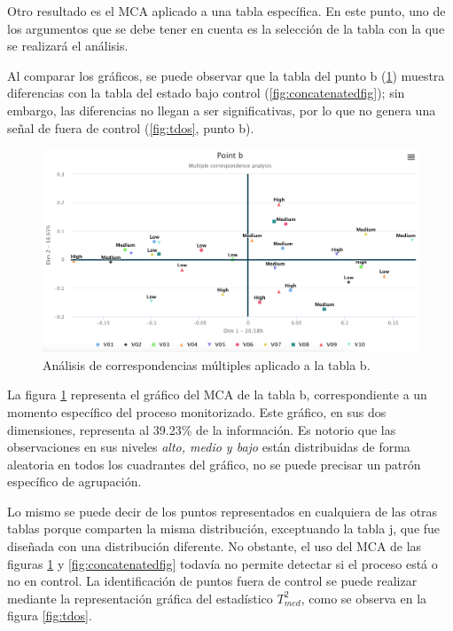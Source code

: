 \documentclass[mathematics,article,submit,moreauthors,pdftex]{mdpi}
\begin{document}
Otro resultado es el MCA aplicado a una tabla específica. En este punto,
uno de los argumentos que se debe tener en cuenta es la selección de la
tabla con la que se realizará el análisis.

Al comparar los gráficos, se puede observar que la tabla del punto b
(\ref{fig:bfig}) muestra diferencias con la tabla del estado bajo
control (\ref{fig:concatenatedfig}); sin embargo, las diferencias no
llegan a ser significativas, por lo que no genera una señal de fuera de
control (\ref{fig:tdos}, punto b).

\begin{figure}[H]


\begin{center}\includegraphics[width=0.9\linewidth,]{pointb} \end{center}

\caption{Análisis de correspondencias múltiples aplicado a la tabla b.}

\label{fig:bfig}
\end{figure}

La figura \ref{fig:bfig} representa el gráfico del MCA de la tabla b,
correspondiente a un momento específico del proceso monitorizado. Este
gráfico, en sus dos dimensiones, representa al 39.23\% de la
información. Es notorio que las observaciones en sus niveles \emph{alto,
medio y bajo} están distribuidas de forma aleatoria en todos los
cuadrantes del gráfico, no se puede precisar un patrón específico de
agrupación.

Lo mismo se puede decir de los puntos representados en cualquiera de las
otras tablas porque comparten la misma distribución, exceptuando la
tabla j, que fue diseñada con una distribución diferente. No obstante,
el uso del MCA de las figuras \ref{fig:bfig} y \ref{fig:concatenatedfig}
todavía no permite detectar si el proceso está o no en control. La
identificación de puntos fuera de control se puede realizar mediante la
representación gráfica del estadístico \(T^2_{med}\), como se observa en
la figura \ref{fig:tdos}.
\end{document}
